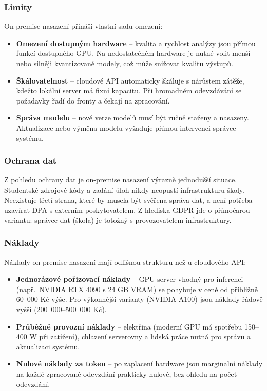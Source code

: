 
\subsubsection*{Limity}

On-premise nasazení přináší vlastní sadu omezení:

\begin{itemize}
    \item \textbf{Omezení dostupným hardware} -- kvalita a rychlost analýzy jsou přímou funkcí dostupného GPU.
    Na nedostatečném hardware je nutné volit menší nebo silněji kvantizované modely, což může snižovat kvalitu výstupů.

    \item \textbf{Škálovatelnost} -- cloudové API automaticky škáluje s nárůstem zátěže, kdežto lokální server má fixní kapacitu.
    Při hromadném odevzdávání se požadavky řadí do fronty a čekají na zpracování.

    \item \textbf{Správa modelu} -- nové verze modelů musí být ručně staženy a nasazeny.
    Aktualizace nebo výměna modelu vyžaduje přímou intervenci správce systému.
\end{itemize}

\subsubsection*{Ochrana dat}

Z pohledu ochrany dat je on-premise nasazení výrazně jednodušší situace.
Studentské zdrojové kódy a zadání úloh nikdy neopustí infrastrukturu školy.
Neexistuje třetí strana, které by musela být svěřena správa dat, a není potřeba uzavírat DPA s externím poskytovatelem.
Z hlediska GDPR jde o přímočarou variantu: správce dat (škola) je totožný s provozovatelem infrastruktury.

\subsubsection*{Náklady}

Náklady on-premise nasazení mají odlišnou strukturu než u cloudového API:

\begin{itemize}
    \item \textbf{Jednorázové pořizovací náklady} -- GPU server vhodný pro inferenci (např.\ NVIDIA RTX 4090 s 24 GB VRAM) se pohybuje v ceně od přibližně 60~000 Kč výše.
    Pro výkonnější varianty (NVIDIA A100) jsou náklady řádově vyšší (200~000--500~000 Kč).

    \item \textbf{Průběžné provozní náklady} -- elektřina (moderní GPU má spotřebu 150--400 W při zatížení), chlazení serverovny a lidská práce nutná pro správu a aktualizaci systému.

    \item \textbf{Nulové náklady za token} -- po zaplacení hardware jsou marginalní náklady na každé zpracované odevzdání prakticky nulové, bez ohledu na počet odevzdání.
\end{itemize}


